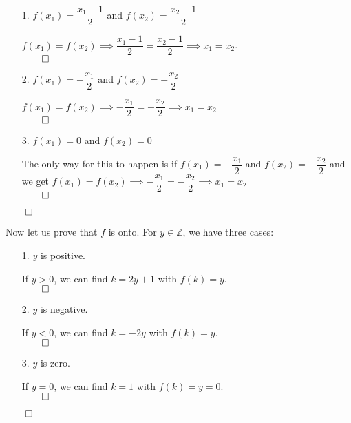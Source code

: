 \documentclass[11pt]{article}
\begin{document}
\begin{itemize}
\begin{itemize}
            \begin{itemize}
                \item[1.]
                    $f(x_1) = \dfrac{x_1 - 1}{2}$ and $f(x_2) =
                    \dfrac{x_2 - 1}{2}$

                    $f(x_1) = f(x_2) \implies \dfrac{x_1 - 1}{2} =
                    \dfrac{x_2 - 1}{2} \implies x_1 = x_2$.\\
                    $\qed$

                \item[2.]
                    $f(x_1) = -\dfrac{x_1}{2}$ and $f(x_2) = -\dfrac{x_2}{2}$

                    $f(x_1) = f(x_2) \implies -\dfrac{x_1}{2} = -\dfrac{x_2}{2}
                    \implies x_1 = x_2$\\
                    $\qed$

                \item[3.]
                    $f(x_1) = 0$ and $f(x_2) = 0$

                    The only way for this to happen is if $f(x_1) =
                    -\dfrac{x_1}{2}$ and $f(x_2) = -\dfrac{x_2}{2}$ and we get
                    $f(x_1) = f(x_2) \implies -\dfrac{x_1}{2} = -\dfrac{x_2}{2}
                    \implies x_1 = x_2$\\
                    $\qed$
            \end{itemize}
            $\qed$

            Now let us prove that $f$ is onto. For $y \in \mathbb{Z}$, we have
            three cases:

            \begin{itemize}
                \item[1.]
                    $y$ is positive.

                    If $y > 0$, we can find $k = 2y + 1$ with $f(k) = y$.\\
                    $\qed$

                \item[2.]
                    $y$ is negative.

                    If $y < 0$, we can find $k = -2y$ with $f(k) = y$.\\
                    $\qed$

                \item[3.]
                    $y$ is zero.

                    If $y = 0$, we can find $k = 1$ with $f(k) = y = 0$.\\
                    $\qed$
            \end{itemize}
            $\qed$


\end{itemize}
\end{itemize}
\end{document}

